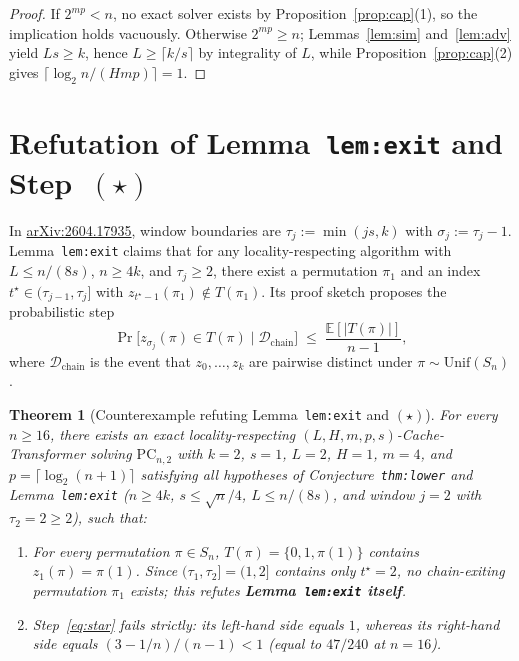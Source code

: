 \documentclass[11pt]{article}
\theoremstyle{plain}
\newtheorem{theorem}{Theorem}
\theoremstyle{definition}
\theoremstyle{remark}
\newcommand{\PC}{\mathrm{PC}}
\begin{document}
\begin{proof}
If $2^{mp} < n$, no exact solver exists by Proposition~\ref{prop:cap}(1), so the implication holds vacuously.
Otherwise $2^{mp} \ge n$; Lemmas~\ref{lem:sim} and~\ref{lem:adv} yield $Ls \ge k$, hence $L \ge \lceil k/s \rceil$ by integrality of $L$, while Proposition~\ref{prop:cap}(2) gives $\lceil \log_2 n / (Hmp) \rceil = 1$.
\end{proof}

\section{Refutation of Lemma~\texttt{lem:exit} and Step~\texorpdfstring{$(\star)$}{(*)}}

In \href{https://arxiv.org/abs/2604.17935}{arXiv:2604.17935}, window boundaries are $\tau_j := \min(js, k)$ with $\sigma_j := \tau_j - 1$. Lemma~\texttt{lem:exit} claims that for any locality-respecting algorithm with $L \le n/(8s)$, $n \ge 4k$, and $\tau_j \ge 2$, there exist a permutation $\pi_1$ and an index $t^\star \in (\tau_{j-1}, \tau_j]$ with $z_{t^\star - 1}(\pi_1) \notin T(\pi_1)$. Its proof sketch proposes the probabilistic step
\begin{equation}\label{eq:star}
\Pr\bigl[z_{\sigma_j}(\pi) \in T(\pi) \mid \mathcal{D}_{\mathrm{chain}}\bigr]
\;\le\; \frac{\mathbb{E}[|T(\pi)|]}{n - 1},
\tag{$\star$}
\end{equation}
where $\mathcal{D}_{\mathrm{chain}}$ is the event that $z_0, \dots, z_k$ are pairwise distinct under $\pi \sim \mathrm{Unif}(S_n)$.

\begin{theorem}[Counterexample refuting Lemma~\texttt{lem:exit} and $(\star)$]\label{thm:refute}
For every $n \ge 16$, there exists an exact locality-respecting $(L, H, m, p, s)$-Cache-Transformer solving $\PC_{n,2}$ with $k = 2$, $s = 1$, $L = 2$, $H = 1$, $m = 4$, and $p = \lceil \log_2(n+1) \rceil$ satisfying all hypotheses of Conjecture~\texttt{thm:lower} and Lemma~\texttt{lem:exit} ($n \ge 4k$, $s \le \sqrt{n}/4$, $L \le n/(8s)$, and window $j = 2$ with $\tau_2 = 2 \ge 2$), such that:
\begin{enumerate}[label=\textup{(\arabic*)},itemsep=2pt]
\item For every permutation $\pi \in S_n$, $T(\pi) = \{0, 1, \pi(1)\}$ contains $z_1(\pi) = \pi(1)$. Since $(\tau_1, \tau_2] = (1, 2]$ contains only $t^\star = 2$, no chain-exiting permutation $\pi_1$ exists; this refutes \textbf{Lemma~\texttt{lem:exit} itself}.
\item Step~\eqref{eq:star} fails strictly: its left-hand side equals $1$, whereas its right-hand side equals $(3 - 1/n)/(n - 1) < 1$ (equal to $47/240$ at $n = 16$).
\end{enumerate}
\end{theorem}
\end{document}

